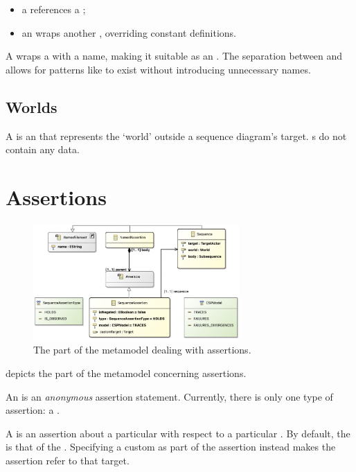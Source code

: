 \begin{itemize}
\item
	a \mrcmoduletarget{} references a \mrcmodule;
\item
	an \moverridetarget{} wraps another \mtarget, overriding constant
	definitions.
\end{itemize}

A \mtargetactor{} wraps a \mtarget{} with a name, making it suitable as an
\mactor.  The separation between \mtarget{} and \mtargetactor{} allows for
patterns like \moverridetarget{} to exist without introducing unnecessary names.

\subsection{Worlds}\label{ssec:metamodel-actors-world}

A \mworld{} is an \mactor{} that represents the `world' outside a sequence
diagram's target.  \mworld s do not contain any data.

\section{Assertions}\label{sec:metamodel-assertions}

\begin{figure}
	\centering
	\includegraphics[width=0.7\textwidth]{diagrams/assertions.png}
	\caption{The part of the \langname{} metamodel dealing with assertions.}
	\label{fig:metamodel-assertions}
\end{figure}

 depicts the part of the metamodel concerning
assertions.

An \massertion{} is an \emph{anonymous} assertion statement.  Currently, there is
only one type of assertion: a \msequenceassertion{}.  

A \msequenceassertion{} is an assertion about a particular \msequence{} with
respect to a particular \mtarget.  By default, the \mtarget{} is that of the
\msequence{}.   Specifying a
custom \mtarget{} as part of the assertion instead makes the assertion refer
to that target.

